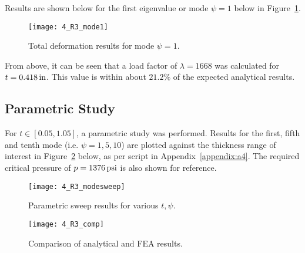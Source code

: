 Results are shown below for the first eigenvalue or mode $\psi = 1$ below in Figure~\ref{fig:4_R3_mode1}.
\begin{figure}[H]
	\centering
	\texttt{[image: 4\_R3\_mode1]}
	\caption{Total deformation results for mode $\psi = 1$.}
	\label{fig:4_R3_mode1}
\end{figure}

From above, it can be seen that a load factor of $\lambda = 1668$ was calculated for $t= 0.418\,\mathrm{in}$. This value is within about $21.2\%$ of the expected analytical results.

\subsection{Parametric Study}

For $t\in [0.05, 1.05]$, a parametric study was performed. Results for the first, fifth and tenth mode (i.e. $\psi = 1, 5, 10$) are plotted against the thickness range of interest in Figure~\ref{fig:4_R3_modesweep} below, as per \cite{PYTHON} script in Appendix~\ref{appendix:a4}. The required critical pressure of $p =1376\,\mathrm{psi}$ is also shown for reference.

\begin{figure}[H]
	\centering
	\texttt{[image: 4\_R3\_modesweep]}
	\caption{Parametric sweep results for various $t, \psi$.}
	\label{fig:4_R3_modesweep}
\end{figure}

\begin{figure}[H]
	\centering
	\texttt{[image: 4\_R3\_comp]}
	\caption{Comparison of analytical and FEA results.}
	\label{fig:4_R3_comp}
\end{figure}



